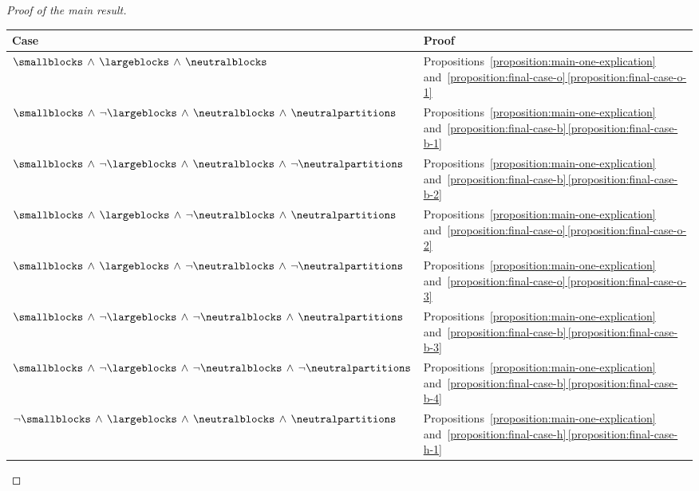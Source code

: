 \documentclass[10pt,a4paper]{amsart}
\numberwithin{equation}{section}
\newcommand\Tstrut{\rule{0pt}{2.6ex}}
\newcommand{\Sand}{\,\wedge\,}
\begin{document}
\begin{proof}[Proof of the main result]
    \begin{table}[h!]\centering\renewcommand{\arraystretch}{1.2}
  \begin{tabular}{l|l}
    Case & Proof  \\ \hline
    $\smallblocks \Sand \largeblocks\Sand\neutralblocks$ & Pro\-po\-si\-tions~\ref{proposition:main-one-explication} and~\hyperref[proposition:final-case-o-1]{\ref*{proposition:final-case-o}\,\ref*{proposition:final-case-o-1}}\Tstrut \\
    $\smallblocks \Sand \neg\largeblocks\Sand\neutralblocks\Sand\neutralpartitions$ & Pro\-po\-si\-tions~\ref{proposition:main-one-explication} and~\hyperref[proposition:final-case-b-1]{\ref*{proposition:final-case-b}\,\ref*{proposition:final-case-b-1}}\\
    $\smallblocks \Sand \neg\largeblocks\Sand\neutralblocks\Sand\neg\neutralpartitions$ & Pro\-po\-si\-tions~\ref{proposition:main-one-explication} and~\hyperref[proposition:final-case-b-2]{\ref*{proposition:final-case-b}\,\ref*{proposition:final-case-b-2}}\\
    $\smallblocks \Sand \largeblocks\Sand\neg\neutralblocks\Sand \neutralpartitions$ & Pro\-po\-si\-tions~\ref{proposition:main-one-explication} and~\hyperref[proposition:final-case-o-2]{\ref*{proposition:final-case-o}\,\ref*{proposition:final-case-o-2}}\\
    $\smallblocks \Sand \largeblocks\Sand\neg\neutralblocks\Sand \neg\neutralpartitions$ & Pro\-po\-si\-tions~\ref{proposition:main-one-explication} and~\hyperref[proposition:final-case-o-3]{\ref*{proposition:final-case-o}\,\ref*{proposition:final-case-o-3}}\\
    $\smallblocks \Sand \neg\largeblocks\Sand\neg\neutralblocks\Sand \neutralpartitions$ & Pro\-po\-si\-tions~\ref{proposition:main-one-explication} and~\hyperref[proposition:final-case-b-3]{\ref*{proposition:final-case-b}\,\ref*{proposition:final-case-b-3}}\\
    $\smallblocks \Sand \neg\largeblocks\Sand\neg\neutralblocks\Sand \neg\neutralpartitions$ & Pro\-po\-si\-tions~\ref{proposition:main-one-explication} and~\hyperref[proposition:final-case-b-4]{\ref*{proposition:final-case-b}\,\ref*{proposition:final-case-b-4}}\\
    $\neg\smallblocks \Sand \largeblocks\Sand\neutralblocks\Sand \neutralpartitions$ & Pro\-po\-si\-tions~\ref{proposition:main-one-explication} and~\hyperref[proposition:final-case-h-1]{\ref*{proposition:final-case-h}\,\ref*{proposition:final-case-h-1}}\\

\end{tabular}
\end{table}
\end{proof}
\end{document}
